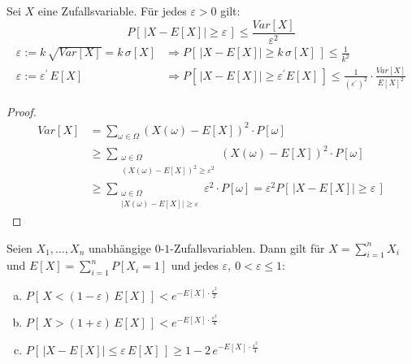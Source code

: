 \begin{satz}[Chebychev]
	Sei $X$ eine Zufallsvariable. Für jedes $\varepsilon > 0$ gilt:
	\[
	  P\left[\,|X-E[X]| \geq \varepsilon\,\right] \leq \frac{Var[X]}{\varepsilon^2}
	\]
	\begin{equation*}
		\begin{array}{ll}
		\varepsilon := k\,\sqrt{Var[X]} = k\,\sigma[X] &\Rightarrow
		P\left[\,|X - E[X]| \geq k\,\sigma[X]\,\right] \leq
		\frac{1}{k^2} \\
		\varepsilon := \varepsilon^\prime\,E[X] &\Rightarrow P\left[\,|X-E[X]| \geq
		\varepsilon^\prime E[X]\,\right] \leq
		\frac{1}{\left(\varepsilon^\prime\right)^2}\cdot\frac{Var[X]}{E[X]^2}
		\end{array}
	\end{equation*}
\end{satz}
\begin{proof}
	\begin{align*}
	  Var[X] &= \sum_{\omega \in \Omega} \left(X(\omega) - E[X]\right)^2
	  \cdot P[\omega] \\ 
	  &\geq
	  \sum_{\substack{\omega\in\Omega\\\left(X(\omega)-E[X]\right)^2\geq\varepsilon^2}}
	  \left(X(\omega) - E[X]\right)^2 \cdot P[\omega]\\
	  &\geq \sum_{\substack{\omega\in\Omega\\|X(\omega)-E[X]|\geq\varepsilon}}
	  \varepsilon^2 \cdot P[\omega] = \varepsilon^2 P\left[\,|X-E[X]| \geq
	  \varepsilon\,\right]
	\end{align*}
\end{proof}
\begin{satz}
	Seien $X_1, \dots, X_n$ unabhängige $0$-$1$-Zufallsvariablen. Dann gilt
	für $X = \sum_{i=1}^n X_i$ und $E[X] = \sum_{i=1}^n P[X_i = 1]$ und
	jedes $\varepsilon, \ 0 < \varepsilon \leq 1$:
	\begin{enumerate}[(a)]
		\item $P\left[\,X < (1-\varepsilon)\,E[X]\,\right] <
			e^{-E[X]\cdot\frac{\varepsilon^2}{2}}$
		\item $P\left[\,X > (1+\varepsilon)\,E[X]\,\right] <
			e^{-E[X]\cdot\frac{\varepsilon^2}{4}}$
		\item $P\left[\,|X-E[X]| \leq \varepsilon\,E[X]\,\right] \geq 1 -
			2\,e^{-E[X]\cdot\frac{\varepsilon^2}{4}}$
	\end{enumerate}
\end{satz}
